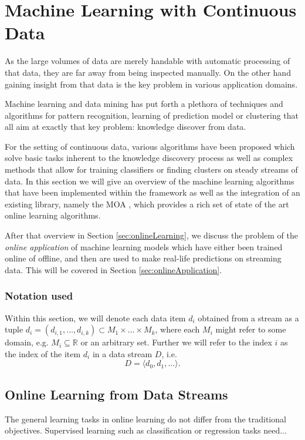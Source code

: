 \clearpage
\section{\label{sec:machineLearning}Machine Learning with Continuous Data}
As the large volumes of data are merely handable with automatic
processing of that data, they are far away from being inspected
manually. On the other hand gaining insight from that data is the key
problem in various application domains.

Machine learning and data mining has put forth a plethora of
techniques and algorithms for pattern recognition, learning of
prediction model or clustering that all aim at exactly that key
problem: knowledge discover from data.

For the setting of continuous data, various algorithms have been
proposed which solve basic tasks inherent to the knowledge discovery
process as well as complex methods that allow for training classifiers
or finding clusters on steady streams of data. In this section we will
give an overview of the machine learning algorithms that have been
implemented within the \streams framework as well as the integration
of an existing library, namely the MOA \cite{moa}, which provides a
rich set of state of the art online learning algorithms. 

After that overview in Section \ref{sec:onlineLearning}, we discuss
the problem of the {\em online application} of machine learning models
which have either been trained online of offline, and then are used to
make real-life predictions on streaming data. This will be covered in
Section \ref{sec:onlineApplication}.

\subsubsection*{Notation used}
Within this section, we will denote each data item $d_i$ obtained from
a stream as a tuple $d_i = (d_{i,1},\ldots,d_{i,k}) \subset
M_1\times\ldots\times M_k$, where each $M_i$ might refer to some
domain, e.g. $M_i \subseteq \mathbb{R}$ or an arbitrary set. Further
we will refer to the index $i$ as the index of the item $d_i$ in a
data stream $D$, i.e.
\begin{displaymath}
  D = \langle d_0,d_1,\ldots \rangle.
\end{displaymath}


\subsection{\label{sec:onlineLearning}Online Learning from Data Streams}
The general learning tasks in online learning do not differ from the
traditional objectives. Supervised learning such as classification or
regression tasks need...

